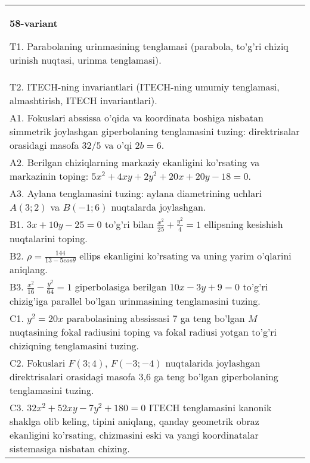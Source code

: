 \documentclass{article}
\begin{document}
\begin{tabular}{m{17cm}}
\textbf{58-variant}
\newline

T1. Parabolaning urinmasining tenglamasi (parabola, to'g'ri chiziq urinish nuqtasi, urinma tenglamasi).\\

T2. ITECH-ning invariantlari (ITECH-ning umumiy tenglamasi, almashtirish, ITECH invariantlari).\\

A1. Fokuslari abssissa o'qida va koordinata boshiga nisbatan simmetrik joylashgan giperbolaning tenglamasini tuzing: direktrisalar orasidagi masofa $32/5$ va o'qi $2b=6$.\\

A2. Berilgan chiziqlarning markaziy ekanligini ko'rsating va markazinin toping: $5x^{2}+4xy+2y^{2}+20x+20y-18=0$.\\

A3. Aylana tenglamasini tuzing: aylana diametrining uchlari $A(3;2)$ va $B(-1;6)$ nuqtalarda joylashgan.\\

B1. $3x + 10y - 25 = 0$ to'g'ri bilan $\frac{x^{2}}{25} + \frac{y^{2}}{4} = 1$ ellipsning kesishish nuqtalarini toping.  \\

B2. $\rho = \frac{144}{13 - 5cos\theta}$ ellips ekanligini ko'rsating va uning yarim o'qlarini aniqlang.\\

B3. $\frac{x^{2}}{16} - \frac{y^{2}}{64} = 1$ giperbolasiga berilgan $10x - 3y + 9 = 0$ to'g'ri chizig'iga parallel bo'lgan urinmasining tenglamasini tuzing.  \\

C1. $y^{2} = 20x$ parabolasining abssissasi 7 ga teng bo'lgan $M$ nuqtasining fokal radiusini toping va fokal radiusi yotgan to'g'ri chiziqning tenglamasini tuzing.  \\

C2. Fokuslari $F(3;4)$, $F(-3;-4)$ nuqtalarida joylashgan direktrisalari orasidagi masofa 3,6 ga teng bo'lgan giperbolaning tenglamasini tuzing.  \\

C3. $32x^{2} + 52xy - 7y^{2} + 180 = 0$ ITECH tenglamasini kanonik shaklga olib keling, tipini aniqlang, qanday geometrik obraz ekanligini ko'rsating, chizmasini eski va yangi koordinatalar sistemasiga nisbatan chizing.  \\

\end{tabular}
\vspace{1cm}
\end{document}
